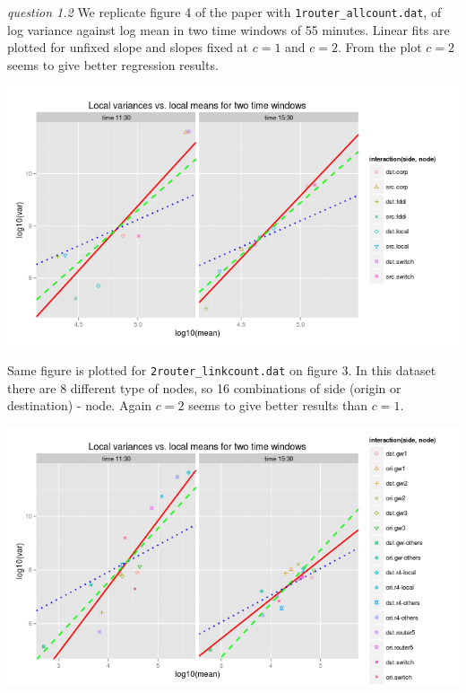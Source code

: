 \documentclass[twoside]{article}
\begin{document}
\textit{question 1.2} We replicate figure 4 of the paper with \texttt{1router\_allcount.dat}, of log variance against log mean in two time windows of 55 minutes. Linear fits are plotted for unfixed slope and slopes fixed at $c = 1$ and $c=2$. From the plot $c=2$ seems to give better regression results.

\begingroup
\centering
\includegraphics[scale=0.4]{./img/logvarlogmean.png}
\endgroup

Same figure is plotted for \texttt{2router\_linkcount.dat} on figure 3. In this dataset there are 8 different type of nodes, so 16 combinations of side (origin or destination) - node. Again $c=2$ seems to give better results than $c=1$.

\begingroup
\centering
\includegraphics[scale=0.4]{./img/logvarlogmean2.png}
\endgroup
\end{document}
